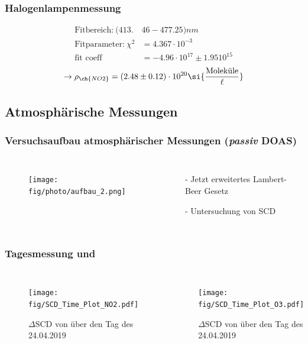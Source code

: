 \documentclass{beamer}
\begin{document}
\begin{frame}
	\frametitle{Halogenlampenmessung}
	\begin{align}
		\text{Fitbereich:}\ (413.&46 - 477.25) \si{nm}\\
		\text{Fitparameter:}\ \chi^2 &= 4.367 \cdot 10^{-3}\\
		\text{fit coeff} &= -4.96 \cdot 10^{17} \pm 1.95 10^{15}
	\end{align}
	\begin{align}    
		\to \rho_{\ch{NO2}} = (2.48 \pm 0.12) \cdot 10^{20} \si{\frac{\text{Moleküle}}{\ell}}
	\end{align}
\end{frame}

\begin{frame}
    \section{Atmosphärische Messungen}
    \frametitle{Versuchsaufbau atmosphärischer Messungen (\textit{passiv} DOAS)}
     \begin{columns}
    		\begin{figure}[h]
    			\texttt{[image: fig/photo/aufbau\_2.png]}
    		\end{figure}
    		\begin{itemize}
    			\item[-] Jetzt erweitertes Lambert-Beer Gesetz
    			\item[-] Untersuchung von SCD
    		\end{itemize}
    \end{columns}
\end{frame}

\begin{frame}
    \frametitle{Tagesmessung  und }
	\begin{columns}
	  	\begin{figure}
	  		\texttt{[image: fig/SCD\_Time\_Plot\_NO2.pdf]}
    		\caption{$\Delta \text{SCD}$ von  über den Tag des 24.04.2019}
    		\label{fig:delta_SCD_time_NO2}
        \end{figure}
    	\begin{figure}
    		\texttt{[image: fig/SCD\_Time\_Plot\_O3.pdf]}
    		\caption{$\Delta \text{SCD}$ von  über den Tag des 24.04.2019}
    		\label{fig:delta_SCD_time_O3}
    	\end{figure}  		
    \end{columns}
\end{frame}
\end{document}

